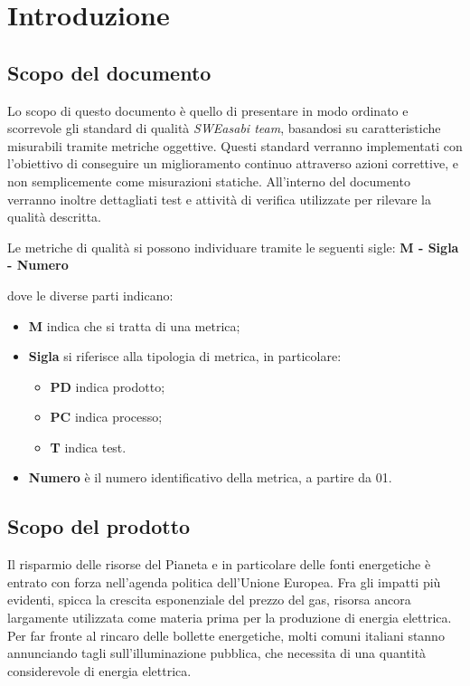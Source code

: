 \chapter{Introduzione}
\section{Scopo del documento}
Lo scopo di questo documento è quello di presentare in modo ordinato e scorrevole gli standard di qualità \textit{SWEasabi team}, basandosi su caratteristiche misurabili tramite metriche oggettive. Questi standard verranno implementati con l'obiettivo di conseguire un miglioramento continuo attraverso azioni correttive, e non semplicemente come misurazioni statiche. All'interno del documento verranno inoltre dettagliati test e attività di verifica utilizzate per rilevare la qualità descritta.

Le metriche di qualità si possono individuare tramite le seguenti sigle: \textbf{M - Sigla - Numero}

dove le diverse parti indicano:

\begin{itemize}
    \item \textbf{M} indica che si tratta di una metrica;
    \item \textbf{Sigla} si riferisce alla tipologia di metrica, in particolare:
    \begin{itemize}
        \item \textbf{PD} indica prodotto;
        \item \textbf{PC} indica processo;
        \item \textbf{T} indica test.
    \end{itemize}
    \item \textbf{Numero} è il numero identificativo della metrica, a partire da 01.
\end{itemize}

\section{Scopo del prodotto}
Il risparmio delle risorse del Pianeta e in particolare delle fonti energetiche è entrato con forza nell'agenda politica dell’Unione Europea. Fra gli impatti più evidenti, spicca la crescita esponenziale del prezzo del gas, risorsa ancora largamente utilizzata come materia prima per la produzione di energia elettrica.
Per far fronte al rincaro delle bollette energetiche, molti comuni italiani stanno annunciando tagli sull’illuminazione pubblica, che necessita di una quantità considerevole di energia elettrica.

